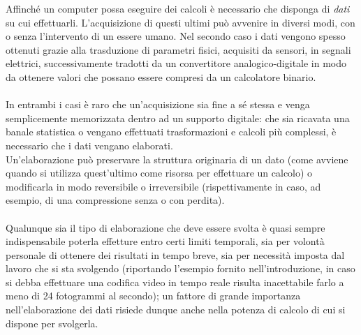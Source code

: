 Affinché un computer possa eseguire dei calcoli è necessario che disponga di
\emph{dati} su cui effettuarli. L'acquisizione di questi ultimi può avvenire
in diversi modi, con o senza l'intervento di un essere umano.
Nel secondo caso i dati vengono spesso ottenuti grazie alla trasduzione 
di parametri fisici, acquisiti da sensori, in segnali elettrici, successivamente
tradotti da un convertitore analogico-digitale in modo da ottenere valori che 
possano essere compresi da un calcolatore binario.
\\ \\
In entrambi i casi è raro che un'acquisizione sia fine a sé stessa e venga
semplicemente memorizzata dentro ad un supporto digitale: che sia ricavata una
banale statistica o vengano effettuati trasformazioni e calcoli più complessi,
è necessario che i dati vengano elaborati. \\
Un'elaborazione può preservare la struttura originaria di un dato (come avviene
quando si utilizza quest'ultimo come risorsa per effettuare un calcolo) o
modificarla in modo reversibile o irreversibile (rispettivamente in caso, ad
esempio, di una compressione senza o con perdita). 
\\ \\
Qualunque sia il tipo di elaborazione che deve essere svolta è quasi sempre
indispensabile poterla effetture entro certi limiti temporali, sia per
volontà personale di ottenere dei risultati in tempo breve, sia per
necessità imposta dal lavoro che si sta svolgendo (riportando l'esempio fornito
nell'introduzione, in caso si debba effettuare una codifica video in tempo reale
risulta inacettabile farlo a meno di 24 fotogrammi al secondo); un fattore di
grande importanza nell'elaborazione dei dati risiede dunque anche nella potenza
di calcolo di cui si dispone per svolgerla.
